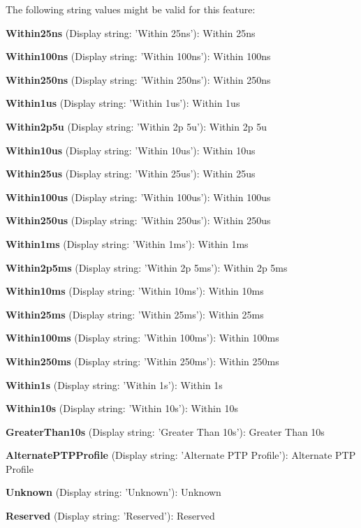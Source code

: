 The following string values might be valid for this feature\+:
\begin{DoxyItemize}
\item {\bfseries Within25ns} (Display string\+: 'Within 25ns')\+: Within 25ns
\item {\bfseries Within100ns} (Display string\+: 'Within 100ns')\+: Within 100ns
\item {\bfseries Within250ns} (Display string\+: 'Within 250ns')\+: Within 250ns
\item {\bfseries Within1us} (Display string\+: 'Within 1us')\+: Within 1us
\item {\bfseries Within2p5u} (Display string\+: 'Within 2p 5u')\+: Within 2p 5u
\item {\bfseries Within10us} (Display string\+: 'Within 10us')\+: Within 10us
\item {\bfseries Within25us} (Display string\+: 'Within 25us')\+: Within 25us
\item {\bfseries Within100us} (Display string\+: 'Within 100us')\+: Within 100us
\item {\bfseries Within250us} (Display string\+: 'Within 250us')\+: Within 250us
\item {\bfseries Within1ms} (Display string\+: 'Within 1ms')\+: Within 1ms
\item {\bfseries Within2p5ms} (Display string\+: 'Within 2p 5ms')\+: Within 2p 5ms
\item {\bfseries Within10ms} (Display string\+: 'Within 10ms')\+: Within 10ms
\item {\bfseries Within25ms} (Display string\+: 'Within 25ms')\+: Within 25ms
\item {\bfseries Within100ms} (Display string\+: 'Within 100ms')\+: Within 100ms
\item {\bfseries Within250ms} (Display string\+: 'Within 250ms')\+: Within 250ms
\item {\bfseries Within1s} (Display string\+: 'Within 1s')\+: Within 1s
\item {\bfseries Within10s} (Display string\+: 'Within 10s')\+: Within 10s
\item {\bfseries Greater\+Than10s} (Display string\+: 'Greater Than 10s')\+: Greater Than 10s
\item {\bfseries Alternate\+P\+T\+P\+Profile} (Display string\+: 'Alternate P\+T\+P Profile')\+: Alternate P\+T\+P Profile
\item {\bfseries Unknown} (Display string\+: 'Unknown')\+: Unknown
\item {\bfseries Reserved} (Display string\+: 'Reserved')\+: Reserved
\end{DoxyItemize}

